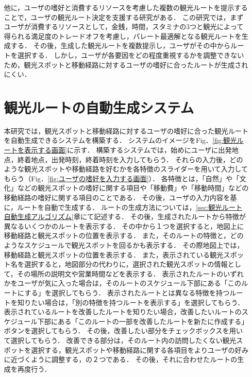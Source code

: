 他に，ユーザの嗜好と消費するリソースを考慮した複数の観光ルートを提示することで，ユーザの観光ルート決定を支援する研究がある\cite{平野}．
この研究では，まずユーザが消費するリソースとして，金銭，時間，スタミナの3つと観光によって得られる満足度のトレードオフを考慮し，パレート最適解となる観光ルートを生成する．
その後，生成した観光ルートを複数提示し，ユーザがその中からルートを選択する．
しかし，ユーザが各要因をどの程度重視するかを調整できないため，観光スポットと移動経路に対するユーザの嗜好に合ったルートが生成されにくい．

\section{観光ルートの自動生成システム}\label{sec:観光ルート自動生成システム}
本研究では，観光スポットと移動経路に対するユーザの嗜好に合った観光ルートを自動生成できるシステムを構築する．
システムのイメージをFig．\ref{fig:観光ルートを表示する画面}に示す．
構築するシステムでは，始めにユーザに出発地点，終着地点，出発時刻，終着時刻を入力してもらう．
それらの入力後，どのような観光スポットや移動経路を好むかを各特徴のスライダーを用いて入力してもらう（Fig．\ref{fig:ユーザの嗜好を入力する画面}）．
各特徴とは，「自然」や「文化」などの観光スポットの嗜好に関する項目や「移動費」や「移動時間」などの移動経路の嗜好に関する項目のことである．
その後，ユーザの入力内容を基に，ルートを自動で生成する．
ルートの生成方法については，\ref{sec:観光ルート自動生成アルゴリズム}章にて記述する．
その後，生成されたルートから特徴が異なるいくつかのルートを表示する．
その中から１つを選択すると，地図上に移動経路と観光スポットの位置を表示する．
また，そのルートの特徴と，どのようなスケジュールで観光スポットを回るかも表示する．
その際地図上では，移動経路と観光スポットの位置を表示する．
また，表示されている観光スポット名を選択すると，地図部分の代わりに，選択された観光スポットの情報として，その場所の説明文や営業時間などを表示する．
表示されたルートのいずれかをユーザが気に入った場合は，そのルートのスケジュール下部にある「このルートにする」を選択してもらう．
表示されたルートとは異なる特徴を持つルートを知りたい場合は，「別の特徴を持つルートを表示する」を選択してもらう．
表示されているルートを改善したルートを知りたい場合，改善したいルートのスケジュール下部にある「このルートの一部を改善したルートを新たに作成する」ボタンを選択してもらう．
その後，改善したい部分をチェックボックスを用いて選択してもらう．
改善できる部分は，そのルート内の訪問したくない観光スポットを選択する，観光スポットや移動経路に関する各項目をよりユーザの好みに近づくように調整する，の２つである．
その後，それに合わせたルートの生成を再度行う．
